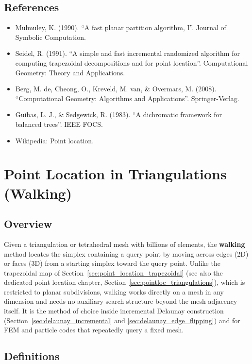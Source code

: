 \subsection{References}

\begin{itemize}
\item Mulmuley, K. (1990). ``A fast planar partition algorithm, I''. Journal of Symbolic Computation.
\item Seidel, R. (1991). ``A simple and fast incremental randomized algorithm for computing trapezoidal decompositions and for point location''. Computational Geometry: Theory and Applications.
\item Berg, M. de, Cheong, O., Kreveld, M. van, \& Overmars, M. (2008). ``Computational Geometry: Algorithms and Applications''. Springer-Verlag.
\item Guibas, L. J., \& Sedgewick, R. (1983). ``A dichromatic framework for balanced trees''. IEEE FOCS.
\item Wikipedia: Point location.
\end{itemize}

\section{Point Location in Triangulations (Walking)}
\label{sec:point_location_walking}

\subsection{Overview}
Given a triangulation or tetrahedral mesh
with billions of elements, the \textbf{walking} method locates the simplex
containing a query point by moving across edges (2D) or faces (3D) from a
starting simplex toward the query point. Unlike the trapezoidal map of
Section~\ref{sec:point_location_trapezoidal} (see also the dedicated point
location chapter, Section~\ref{sec:pointloc_triangulations}), which is
restricted to planar subdivisions, walking works directly on a mesh in any
dimension and needs no auxiliary search structure beyond the mesh adjacency
itself. It is the method of choice inside incremental Delaunay construction
(Section~\ref{sec:delaunay_incremental} and \ref{sec:delaunay_edge_flipping})
and for FEM and particle codes that repeatedly query a fixed mesh.

\subsection{Definitions}

